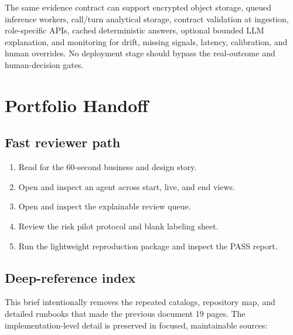 \documentclass[11pt,letterpaper]{article}
\newenvironment{compactenum}{\begin{enumerate}\setlength{\itemsep}{2pt}\setlength{\parskip}{0pt}\setlength{\topsep}{3pt}}{\end{enumerate}}
\begin{document}
The same evidence contract can support encrypted object storage, queued inference
workers, call/turn analytical storage, contract validation at ingestion, role-specific
APIs, cached deterministic answers, optional bounded LLM explanation, and monitoring
for drift, missing signals, latency, calibration, and human overrides. No deployment
stage should bypass the real-outcome and human-decision gates.

\clearpage
\section{Portfolio Handoff}

\subsection*{Fast reviewer path}

\begin{compactenum}
  \item Read  for the 60-second business and design story.
  \item Open  and inspect an agent across
  start, live, and end views.
  \item Open  and inspect the explainable review
  queue.
  \item Review the risk pilot protocol and blank labeling sheet.
  \item Run the lightweight reproduction package and inspect the PASS report.
\end{compactenum}

\subsection*{Deep-reference index}

This brief intentionally removes the repeated catalogs, repository map, and detailed
runbooks that made the previous document 19 pages. The implementation-level detail is
preserved in focused, maintainable sources:
\end{document}
